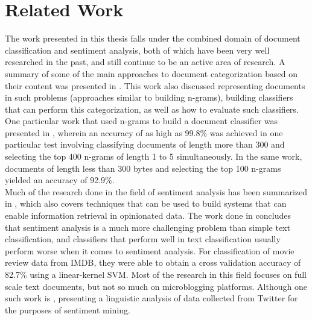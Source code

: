 \chapter{Related Work}
\label{chapter:Related Work}

The work presented in this thesis falls under the combined domain of document classification and sentiment analysis, both of which have been very well researched in the past, and still continue to be an active area of research. A summary of some of the main approaches to document categorization based on their content was presented in \cite{sebastiani2002machine}. This work also discussed representing documents in such problems (approaches similar to building n-grams), building classifiers that can perform this categorization, as well as how to evaluate such classifiers. One particular work that used n-grams to build a document classifier was presented in \cite{cavnar1994n}, wherein an accuracy of as high as 99.8\% was achieved in one particular test involving classifying documents of length more than 300 and selecting the top 400 n-grams of length 1 to 5 simultaneously. In the same work, documents of length less than 300 bytes and selecting the top 100 n-grams yielded an accuracy of 92.9\%.\\

Much of the research done in the field of sentiment analysis has been summarized in \cite{pang2008opinion}, which also covers techniques that can be used to build systems that can enable information retrieval in opinionated data. The work done in \cite{pang2002thumbs} concludes that sentiment analysis is a much more challenging problem than simple text classification, and classifiers that perform well in text classification usually perform worse when it comes to sentiment analysis. For classification of movie review data from IMDB, they were able to obtain a cross validation accuracy of 82.7\% using a linear-kernel SVM. Most of the research in this field focuses on full scale text documents, but not so much on microblogging platforms. Although one such work is \cite{pak2010twitter}, presenting a linguistic analysis of data collected from Twitter for the purposes of sentiment mining.\\

